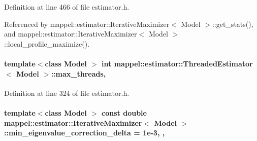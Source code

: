 Definition at line 466 of file estimator.\+h.



Referenced by mappel\+::estimator\+::\+Iterative\+Maximizer$<$ Model $>$\+::get\+\_\+stats(), and mappel\+::estimator\+::\+Iterative\+Maximizer$<$ Model $>$\+::local\+\_\+profile\+\_\+maximize().

\paragraph[{\texorpdfstring{max\+\_\+threads}{max_threads}}]{\setlength{\rightskip}{0pt plus 5cm}template$<$class Model $>$ int {\bf mappel\+::estimator\+::\+Threaded\+Estimator}$<$ Model $>$\+::max\+\_\+threads\hspace{0.3cm}{\ttfamily [protected]}, {\ttfamily [inherited]}}\hypertarget{classmappel_1_1estimator_1_1ThreadedEstimator_ab4c55ecff71dff47c0584ce20fe7f077}{}\label{classmappel_1_1estimator_1_1ThreadedEstimator_ab4c55ecff71dff47c0584ce20fe7f077}


Definition at line 324 of file estimator.\+h.

\paragraph[{\texorpdfstring{min\+\_\+eigenvalue\+\_\+correction\+\_\+delta}{min_eigenvalue_correction_delta}}]{\setlength{\rightskip}{0pt plus 5cm}template$<$class Model $>$ const double {\bf mappel\+::estimator\+::\+Iterative\+Maximizer}$<$ Model $>$\+::min\+\_\+eigenvalue\+\_\+correction\+\_\+delta = 1e-\/3\hspace{0.3cm}{\ttfamily [static]}, {\ttfamily [protected]}, {\ttfamily [inherited]}}\hypertarget{classmappel_1_1estimator_1_1IterativeMaximizer_a9c23c94f649688d01e9eb938a692c6f5}{}\label{classmappel_1_1estimator_1_1IterativeMaximizer_a9c23c94f649688d01e9eb938a692c6f5}


